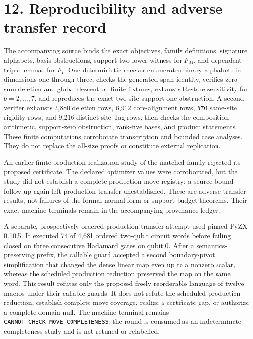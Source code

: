 \documentclass[11pt]{article}
\begin{document}
\section*{12. Reproducibility and adverse transfer record}\label{reproducibility-and-adverse-transfer-record}

The accompanying source binds the exact objectives, family definitions, signature alphabets, basis obstructions, support-two lower witness for \(F_M\), and dependent-triple lemmas for \(F_I\). One deterministic checker enumerates binary alphabets in dimensions one through three, checks the generated-span identity, verifies zero-sum deletion and global descent on finite fixtures, exhausts Restore sensitivity for \(b=2,\ldots,7\), and reproduces the exact two-site support-one obstruction. A second verifier exhausts 2,880 deletion rows, 6,912 core-alignment rows, 576 same-site rigidity rows, and 9,216 distinct-site Tag rows, then checks the composition arithmetic, support-zero obstruction, rank-five bases, and product statements. These finite computations corroborate transcription and bounded case analyses. They do not replace the all-size proofs or constitute external replication.

An earlier finite production-realization study of the matched family rejected its proposed certificate. The declared optimizer values were corroborated, but the study did not establish a complete production move registry; a source-bound follow-up again left production transfer unestablished. These are adverse transfer results, not failures of the formal normal-form or support-budget theorems. Their exact machine terminals remain in the accompanying provenance ledger.

A separate, prospectively ordered production-transfer attempt used pinned PyZX 0.10.5. It executed 74 of 4,681 ordered two-qubit circuit words before failing closed on three consecutive Hadamard gates on qubit 0. After a semantics-preserving prefix, the callable guard accepted a second boundary-pivot simplification that changed the dense linear map even up to a nonzero scalar, whereas the scheduled production reduction preserved the map on the same word. This result refutes only the proposed freely reorderable language of twelve macros under their callable guards. It does not refute the scheduled production reduction, establish complete move coverage, realize a certificate gap, or authorize a complete-domain null. The machine terminal remains \texttt{CANNOT\_CHECK\_MOVE\_COMPLETENESS}: the round is consumed as an indeterminate completeness study and is not retuned or relabelled.
\end{document}
